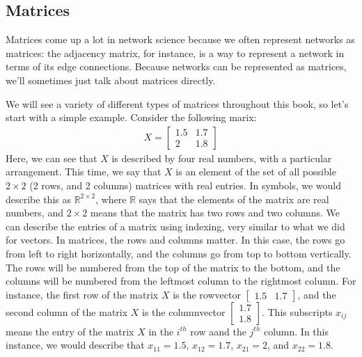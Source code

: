 \documentclass[letterpaper,10pt,english]{jupyterBook}
\begin{document}
\subsection{Matrices}
\label{\detokenize{introduction/terminology:matrices}}
\sphinxAtStartPar
Matrices come up a lot in network science because we often represent networks as matrices: the adjacency matrix, for instance, is a way to represent a network in terms of its edge connections. Because networks can be represented as matrices, we’ll sometimes just talk about matrices directly.

\sphinxAtStartPar
We will see a variety of different types of matrices throughout this book, so let’s start with a simple example. Consider the following marix:
\begin{align*}
    X = \begin{bmatrix}
    1.5 & 1.7 \\
    2 & 1.8
    \end{bmatrix}
\end{align*}
\sphinxAtStartPar
Here, we can see that \(X\) is described by four real numbers, with a particular arrangement. This time, we say that \(X\) is an element of the set of all possible \(2 \times 2\) (2 rows, and 2 columns) matrices with real entries. In symbols, we would describe this as \(\mathbb R^{2 \times 2}\), where \(\mathbb R\) says that the elements of the matrix are real numbers, and \(2 \times 2\) means that the matrix has two rows and two columns. We can describe the entries of a matrix using indexing, very similar to what we did for vectors. In matrices, the rows and columns matter. In this case, the rows go from left to right horizontally, and the columns go from top to bottom vertically. The rows will be numbered from the top of the matrix to the bottom, and the columns will be numbered from the left\sphinxhyphen{}most column to the right\sphinxhyphen{}most column. For instance, the first row of the matrix \(X\) is the row\sphinxhyphen{}vector \(\begin{bmatrix}1.5 & 1.7\end{bmatrix}\), and the second column of the matrix \(X\) is the column\sphinxhyphen{}vector \(\begin{bmatrix}1.7 \\ 1.8\end{bmatrix}\). This subscripts \(x_{ij}\) means the entry of the matrix \(X\) in the \(i^{th}\) row aand the \(j^{th}\) column. In this instance, we would describe that \(x_{11} = 1.5\), \(x_{12} = 1.7\), \(x_{21}=2\), and \(x_{22} = 1.8\).
\end{document}
